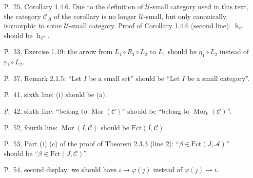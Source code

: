 \documentclass[12pt]{article}
\theoremstyle{remark}
\theoremstyle{definition}
\newcommand{\A}{\mathcal A}
\newcommand{\C}{\mathcal C}
\newcommand{\U}{\mathcal U}
\DeclareMathOperator*{\coli}{colim}
\DeclareMathOperator{\hy}{h}
\DeclareMathOperator{\Hom}{Hom}%
\DeclareMathOperator{\Mor}{Mor}
\DeclareMathOperator{\op}{op}
\begin{document}



\noindent P.~25, Corollary 1.4.6. Due to the definition of $\U$-small category used in this text, the category $\C_A$ of the corollary is no longer $\U$-small, but only canonically isomorphic to some $\U$-small category. Proof of Corollary 1.4.6 (second line): $\hy_{\C}$ should be $\hy_{\C'}$. 

\noindent P.~33, Exercise 1.19: the arrow from $L_1\circ R_1\circ L_2$ to $L_1$ should be $\eta_1\circ L_2$ instead of $\varepsilon_1\circ L_2$. 


\noindent P.~37, Remark 2.1.5: ``Let $I$ be a small set'' should be ``Let $I$ be a small category''.

\noindent P.~41, sixth line: (i) should be (a). 

\noindent P.~42, sixth line: ``belong to $\Mor(\C)$'' should be ``belong to $\Mor_0(\C)$''.

\noindent P.~52, fourth line: $\Mor(I,\C)$ should be $\text{Fct}(I,\C)$. 

\noindent P.~53, Part (i) (c) of the proof of Theorem 2.3.3 (line 2): ``$\beta\in\text{Fct}(J,\A)$'' should be ``$\beta\in\text{Fct}(J,\C)$''.

\noindent P.~54, second display: we should have $i\to\varphi(j)$ instead of $\varphi(j)\to i$. 

\end{document}

